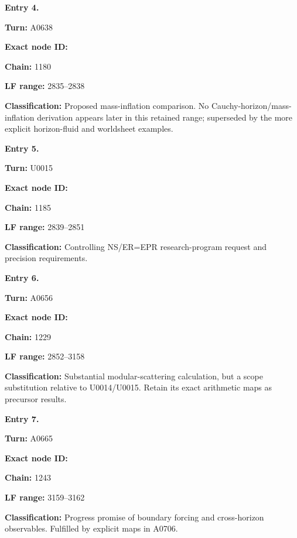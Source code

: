 
\textbf{Entry 4.}

\textbf{Turn:} A0638

\textbf{Exact node ID:}
\protect{}

\textbf{Chain:} 1180

\textbf{LF range:} 2835--2838

\textbf{Classification:} Proposed mass-inflation comparison. No
Cauchy-horizon/mass-inflation derivation appears later in this retained
range; superseded by the more explicit horizon-fluid and worldsheet
examples.


\textbf{Entry 5.}

\textbf{Turn:} U0015

\textbf{Exact node ID:}
\protect{}

\textbf{Chain:} 1185

\textbf{LF range:} 2839--2851

\textbf{Classification:} Controlling NS/ER=EPR research-program request
and precision requirements.


\textbf{Entry 6.}

\textbf{Turn:} A0656

\textbf{Exact node ID:}
\protect{}

\textbf{Chain:} 1229

\textbf{LF range:} 2852--3158

\textbf{Classification:} Substantial modular-scattering calculation, but
a scope substitution relative to U0014/U0015. Retain its exact
arithmetic maps as precursor results.


\textbf{Entry 7.}

\textbf{Turn:} A0665

\textbf{Exact node ID:}
\protect{}

\textbf{Chain:} 1243

\textbf{LF range:} 3159--3162

\textbf{Classification:} Progress promise of boundary forcing and
cross-horizon observables. Fulfilled by explicit maps in A0706.


